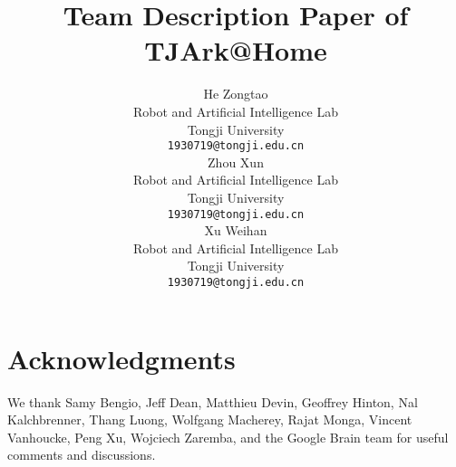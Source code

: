 \documentclass{article}
\title{Team Description Paper of TJArk@Home}
\author{
He Zongtao \\
Robot and Artificial Intelligence Lab\\
Tongji University \\
\texttt{1930719@tongji.edu.cn} \\
\And
Zhou Xun \\
Robot and Artificial Intelligence Lab\\
Tongji University \\
\texttt{1930719@tongji.edu.cn} \\
\And
Xu Weihan \\
Robot and Artificial Intelligence Lab\\
Tongji University \\
\texttt{1930719@tongji.edu.cn} \\
}
\begin{document}
\maketitle














\small
\section{Acknowledgments}

We thank Samy Bengio, Jeff Dean, Matthieu Devin, Geoffrey Hinton, Nal Kalchbrenner, Thang Luong, Wolfgang
Macherey, Rajat Monga, Vincent Vanhoucke, Peng Xu, Wojciech Zaremba,
and the Google Brain team for useful comments and discussions.


 


\newpage

\end{document}
